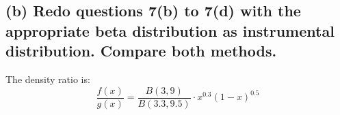 











\subsection*{(b) Redo questions 7(b) to 7(d) with the appropriate beta distribution as instrumental distribution. Compare both methods.}



The density ratio is:
\begin{equation}
\frac{f(x)}{g(x)} = \frac{B(3, 9)}{B(3.3, 9.5)} \cdot x^{0.3} (1 - x)^{0.5}    
\end{equation}

